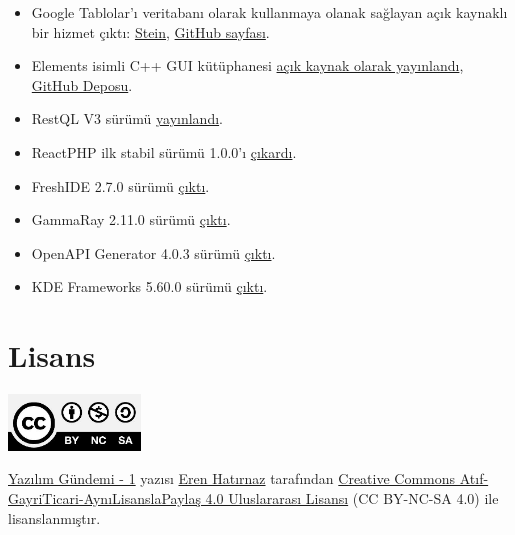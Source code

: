 \documentclass[11pt]{article}
\begin{document}
\begin{itemize}
\item Google Tablolar'ı veritabanı olarak kullanmaya olanak sağlayan açık kaynaklı
bir hizmet çıktı: \href{https://steinhq.com/}{Stein}, \href{https://github.com/SteinHQ}{GitHub sayfası}.
\item Elements isimli C++ GUI kütüphanesi \href{https://www.cycfi.com/2019/07/photon-micro-gui/}{açık kaynak olarak yayınlandı}, \href{https://github.com/cycfi/elements}{GitHub
Deposu}.
\item RestQL V3 sürümü \href{https://www.infoq.com/news/2019/07/restql-v3-released/}{yayınlandı}.
\item ReactPHP ilk stabil sürümü 1.0.0'ı \href{https://github.com/reactphp/react/releases/tag/v1.0.0}{çıkardı}.
\item FreshIDE 2.7.0 sürümü \href{https://fresh.flatassembler.net/index.cgi?page=content/2\_download.txt}{çıktı}.
\item GammaRay 2.11.0 sürümü \href{https://www.kdab.com/gammaray-2-11-0-release/}{çıktı}.
\item OpenAPI Generator 4.0.3 sürümü \href{https://github.com/OpenAPITools/openapi-generator/releases/tag/v4.0.3}{çıktı}.
\item KDE Frameworks 5.60.0 sürümü \href{https://kde.org/announcements/kde-frameworks-5.60.0.php}{çıktı}.
\end{itemize}
\section{Lisans}
\label{sec:org74b7bd4}
\begin{center}
\begin{center}
\includegraphics[height=1.5cm]{../../../img/CC_BY-NC-SA_4.0.png}
\end{center}

\href{yazilim-gundemi-01.pdf}{Yazılım Gündemi - 1} yazısı \href{https://erenhatirnaz.github.io}{Eren Hatırnaz} tarafından \href{http://creativecommons.org/licenses/by-nc-sa/4.0/}{Creative Commons
Atıf-GayriTicari-AynıLisanslaPaylaş 4.0 Uluslararası Lisansı} (CC BY-NC-SA 4.0)
ile lisanslanmıştır.
\end{center}
\end{document}
